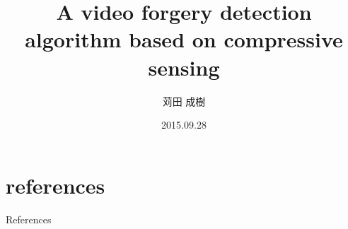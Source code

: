 \documentclass[dvipdfmx,11pt,notheorems]{beamer}
\title[L. Su et al (2015), A video forgery detection algorithm based on compressive sensing]{A video forgery detection algorithm based on compressive sensing}
\author[Shigeki Karita]{苅田 成樹}
\institute[M2]{M2}
\date{2015.09.28}
\begin{document}








\section*{references}
\begin{frame}[allowframebreaks]{References}
%     
    \printbibliography
\end{frame}
\end{document}
